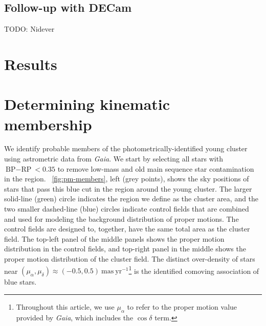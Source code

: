 \documentclass[modern]{aastex62}
\newcommand{\gaia}{\textsl{Gaia}}
\newcommand{\decam}{DECam}
\newcommand{\todo}[1]{{\color{red} TODO: #1}}
\newcommand{\masyr}{\ensuremath{\textrm{mas}~\textrm{yr}^{-1}}}
\newcommand{\hi}{H{\footnotesize I} }
\newcommand{\hie}{H{\footnotesize I}}
\newcommand{\bprp}{\ensuremath{\textrm{BP} - \textrm{RP}}}
\begin{document}
\subsection{Follow-up with \decam}
\label{sec:decam}

\todo{Nidever}



\section{Results} \label{sec:results}

\section{Determining kinematic membership}
\label{sec:pmclean}

We identify probable members of the photometrically-identified young cluster using astrometric data from \gaia.
We start by selecting all stars with $\bprp < 0.35$ to remove low-mass and old main sequence star contamination in the region.
\figurename~\ref{fig:pm-members}, left (grey points), shows the sky positions of stars that pass this blue cut in the region around the young cluster.
The larger solid-line (green) circle indicates the region we define as the cluster area, and the two smaller dashed-line (blue) circles indicate control fields that are combined and used for modeling the background distribution of proper motions.
The control fields are designed to, together, have the same total area as the cluster field.
The top-left panel of the middle panels shows the proper motion distribution in the control fields, and top-right panel in the middle shows the proper motion distribution of the cluster field.
The distinct over-density of stars near $(\mu_\alpha, \mu_\delta) \approx (-0.5, 0.5)~\masyr$\footnote{Throughout this article, we use $\mu_\alpha$ to refer to the proper motion value provided by \gaia, which includes the $\cos\delta$ term.} is the identified comoving association of blue stars.
\end{document}
